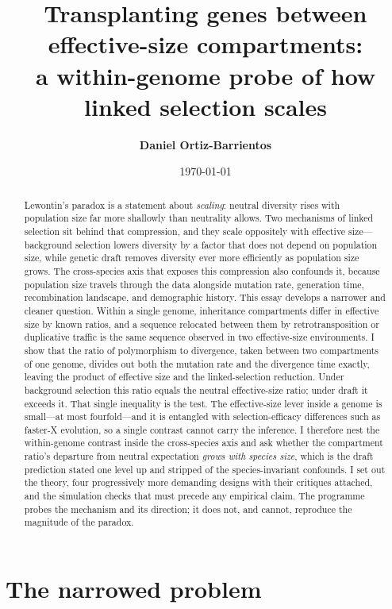 \documentclass[11pt,a4paper]{article}
\title{\textbf{Transplanting genes between effective-size compartments:\\ a within-genome probe of how linked selection scales}}
\author{\textbf{Daniel Ortiz-Barrientos}}
\date{\today}
\begin{document}
\maketitle

\begin{abstract}
\noindent Lewontin's paradox is a statement about \emph{scaling}: neutral diversity rises with population size far more shallowly than neutrality allows. Two mechanisms of linked selection sit behind that compression, and they scale oppositely with effective size---background selection lowers diversity by a factor that does not depend on population size, while genetic draft removes diversity ever more efficiently as population size grows. The cross-species axis that exposes this compression also confounds it, because population size travels through the data alongside mutation rate, generation time, recombination landscape, and demographic history. This essay develops a narrower and cleaner question. Within a single genome, inheritance compartments differ in effective size by known ratios, and a sequence relocated between them by retrotransposition or duplicative traffic is the same sequence observed in two effective-size environments. I show that the ratio of polymorphism to divergence, taken between two compartments of one genome, divides out both the mutation rate and the divergence time exactly, leaving the product of effective size and the linked-selection reduction. Under background selection this ratio equals the neutral effective-size ratio; under draft it exceeds it. That single inequality is the test. The effective-size lever inside a genome is small---at most fourfold---and it is entangled with selection-efficacy differences such as faster-X evolution, so a single contrast cannot carry the inference. I therefore nest the within-genome contrast inside the cross-species axis and ask whether the compartment ratio's departure from neutral expectation \emph{grows with species size}, which is the draft prediction stated one level up and stripped of the species-invariant confounds. I set out the theory, four progressively more demanding designs with their critiques attached, and the simulation checks that must precede any empirical claim. The programme probes the mechanism and its direction; it does not, and cannot, reproduce the magnitude of the paradox.
\end{abstract}

\section{The narrowed problem}
\end{document}
